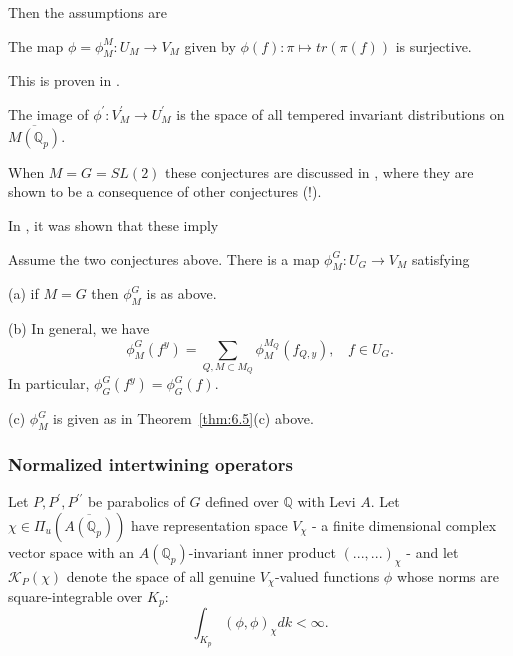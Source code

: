 Then the assumptions are

\begin{conjecture}\label{conj:6.7}
The map $\phi =\phi_M^M :U_M\rightarrow V_M$ given by
$\phi (f):\pi \longmapsto tr(\pi (f)) $ is surjective.
\end{conjecture}

This is proven in \cite[appendix]{A16}.

\begin{conjecture}\label{conj:6.8}
The image of $\phi ^{\prime }:V_M^{\prime }\rightarrow U_M^{\prime }$ is the
space of all tempered invariant distributions on
$\overline{M({\mathbb{Q}}_p)}$.
\end{conjecture}

When $M=G=SL(2)$ these conjectures are discussed in \cite{J1}, where
they are shown to be a consequence of other conjectures (!).

In \cite{A6}, it was shown that these imply
\begin{theorem}\label{thm:6.9} Assume the two conjectures above.
There is a map
$\phi^G_M :U_G\rightarrow V_M$ satisfying

(a) if $M=G$ then $\phi_M^G$ is as above.

(b) In general, we have
\[
\phi_M^G(f^y)=
\sum_{ Q , M\subset M_Q}
\phi_M^{M_Q}(f_{Q,y}),\ \ \ \ f\in U_G.
\]
In particular, $\phi_G^G(f^y)=\phi_G^G(f)$.

(c) $\phi_M^G$ is given as in Theorem~\ref{thm:6.5}(c) above.
\end{theorem}

\subsubsection{Normalized intertwining operators}\label{sssec:normint}

Let $P,P^{\prime },P^{\prime \prime }$ be parabolics of
$G$ defined over ${\mathbb{Q}}$
with Levi $A$. Let $\chi \in \Pi _u({\overline{A({\mathbb{Q}}_p)}})$ have
representation space $V_\chi $ - a finite dimensional complex vector space
with an ${A({\mathbb {Q}}_p)}$-invariant inner product
$(...,...)_\chi $ - and let ${\mathcal{K}}_P(\chi )$ denote the space of all
genuine $V_\chi $-valued functions $\phi $
whose norms are square-integrable over
${K_p}$: 
\[
\int_{K_p}(\phi ,\phi )_\chi dk<\infty . 
\]

